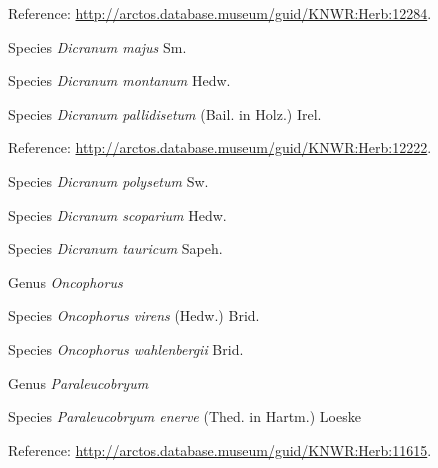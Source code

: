 \documentclass[9pt, article]{memoir}
\begin{document}
\begin{multicols}{2}
\vspace{6pt}Reference: 
\url{http://arctos.database.museum/guid/KNWR:Herb:12284}.

\vspace{6pt}\noindent\hspace{36pt}Species \textit{Dicranum majus} Sm.


\vspace{6pt}\noindent\hspace{36pt}Species \textit{Dicranum montanum} Hedw.


\vspace{6pt}\noindent\hspace{36pt}Species \textit{Dicranum pallidisetum} (Bail. in Holz.) Irel.


\vspace{6pt}Reference: 
\url{http://arctos.database.museum/guid/KNWR:Herb:12222}.

\vspace{6pt}\noindent\hspace{36pt}Species \textit{Dicranum polysetum} Sw.


\vspace{6pt}\noindent\hspace{36pt}Species \textit{Dicranum scoparium} Hedw.


\vspace{6pt}\noindent\hspace{36pt}Species \textit{Dicranum tauricum} Sapeh.


\vspace{6pt}\noindent\hspace{30pt}Genus \textit{Oncophorus}


\vspace{6pt}\noindent\hspace{36pt}Species \textit{Oncophorus virens} (Hedw.) Brid.


\vspace{6pt}\noindent\hspace{36pt}Species \textit{Oncophorus wahlenbergii} Brid.


\vspace{6pt}\noindent\hspace{30pt}Genus \textit{Paraleucobryum}


\vspace{6pt}\noindent\hspace{36pt}Species \textit{Paraleucobryum enerve} (Thed. in Hartm.) Loeske


\vspace{6pt}Reference: 
\url{http://arctos.database.museum/guid/KNWR:Herb:11615}.


\end{multicols}
\end{document}

